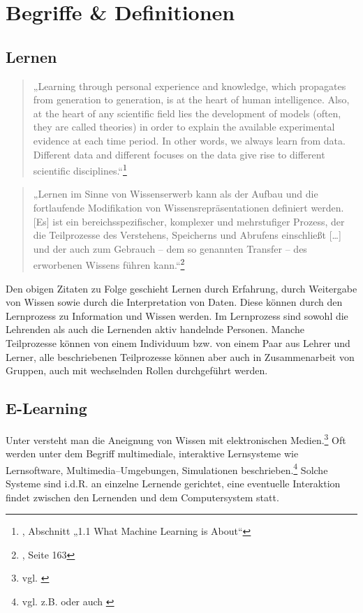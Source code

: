 \label{sec:grundlagen}

\section{Begriffe \& Definitionen} %
\label{sec:definitionen}

\subsection{Lernen} %
\label{sub:lernen}
\begin{quote}„Learning through personal experience and knowledge, which propagates from generation to generation, is at the heart of human intelligence. Also, at the heart of any scientific field lies the development of models (often, they are called theories) in order to explain the available experimental evidence at each time period. In other words, we always learn from data. Different data and different focuses on the data give rise to different scientific disciplines.“\footnote{\cite{mlearning}, Abschnitt „1.1 What Machine Learning is About“}
\end{quote}

\begin{quote}„Lernen im Sinne von Wissenserwerb kann als der Aufbau und die fortlaufende Modifikation von Wissensrepräsentationen definiert werden. [Es] ist ein bereichsspezifischer, komplexer und mehrstufiger Prozess, der die Teilprozesse des Verstehens, Speicherns und Abrufens einschließt […] und der auch zum Gebrauch – dem so genannten Transfer – des erworbenen Wissens führen kann.“\footnote{\cite{steiner}, Seite 163}
\end{quote}

Den obigen Zitaten zu Folge geschieht Lernen durch Erfahrung, durch Weitergabe von Wissen sowie durch die Interpretation von Daten. Diese können durch den Lernprozess zu Information und Wissen werden. Im Lernprozess sind sowohl die Lehrenden als auch die Lernenden aktiv handelnde Personen. Manche Teilprozesse können von einem Individuum bzw. von einem Paar aus Lehrer und Lerner, alle beschriebenen Teilprozesse können aber auch in Zusammenarbeit von Gruppen, auch mit wechselnden Rollen durchgeführt werden.

\subsection{E-Learning} %
\label{sub:e_learning}
Unter  versteht man die Aneignung von Wissen mit elektronischen Medien.\footnote{vgl. \cite{gabler:elearning}} Oft werden unter dem Begriff multimediale, interaktive Lernsysteme wie Lernsoftware, Multimedia–Umgebungen, Simulationen beschrieben.\footnote{vgl. z.B. \cite{schulmeister} oder auch \cite{euler}} Solche Systeme sind i.d.R. an einzelne Lernende gerichtet, eine eventuelle Interaktion findet zwischen den Lernenden und dem Computersystem statt.

